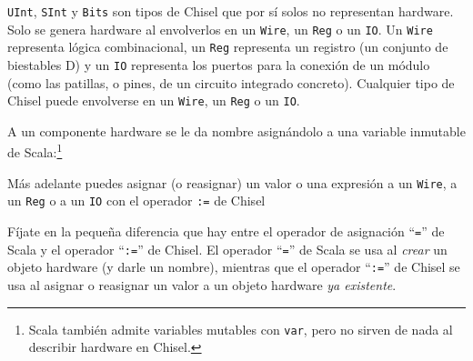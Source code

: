 \documentclass[%
    10pt,
    headinclude, footinclude=false,
    openright, %
    notitlepage,
    cleardoublepage=empty,
    headsepline,
    numbers=noenddot,
    bibliography=totoc, index=totoc,
    ]{scrbook}
\newcommand{\code}[1]{{\lstinline[basicstyle=\small\ttfamily]{#1}}}
\newcommand{\codefoot}[1]{{\lstinline[basicstyle=\footnotesize\ttfamily]{#1}}}
\begin{document}
\code{UInt}, \code{SInt} y \code{Bits} son tipos de Chisel que por sí solos no
representan hardware. Solo se genera hardware al envolverlos en un \code{Wire}, un \code{Reg}
o un \code{IO}. Un \code{Wire} representa lógica combinacional, un \code{Reg}
representa un registro (un conjunto de biestables D) y un \code{IO} representa los puertos
para la conexión de un módulo (como las patillas, o pines, de un circuito integrado concreto).
Cualquier tipo de Chisel puede envolverse en un \code{Wire}, un \code{Reg} o un \code{IO}.


A un componente hardware se le da nombre asignándolo a una variable inmutable de
Scala:\footnote{Scala también admite variables mutables con \codefoot{var}, pero no sirven de nada
al describir hardware en Chisel.}



\noindent Más adelante puedes asignar (o reasignar) un valor o una expresión a un \code{Wire}, a un \code{Reg}
o a un \code{IO} con el operador \code{:=} de Chisel



\noindent Fíjate en la pequeña diferencia que hay entre el operador de asignación ``\code{=}'' de Scala
y el operador ``\code{:=}'' de Chisel. El operador ``\code{=}'' de Scala se usa al \emph{crear} un objeto
hardware (y darle un nombre), mientras que el operador ``\code{:=}'' de Chisel se usa al asignar o reasignar
un valor a un objeto hardware \emph{ya existente}.

\end{document}
